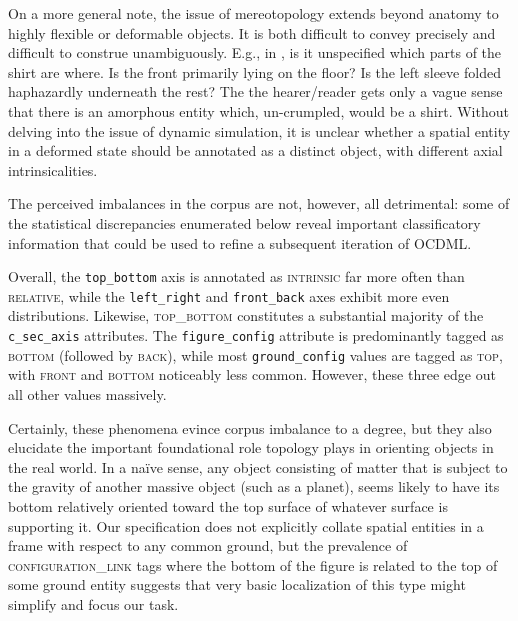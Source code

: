 \documentclass[11pt]{article}
\begin{document}
On a more general note, the issue of mereotopology extends beyond anatomy to highly flexible or deformable objects. It is both difficult to convey precisely and difficult to construe unambiguously. E.g., in , is it unspecified which parts of the shirt are where. Is the front primarily lying on the floor? Is the left sleeve folded haphazardly underneath the rest? The the hearer/reader gets only a vague sense that there is an amorphous entity which, un-crumpled, would be a shirt. Without delving into the issue of dynamic simulation, it is unclear whether a spatial entity in a deformed state should be annotated as a distinct object, with different axial intrinsicalities.

\label{ex:shirt-crumpled}

The perceived imbalances in the corpus are not, however, all detrimental: some of the statistical discrepancies enumerated below reveal important classificatory information that could be used to refine a subsequent iteration of OCDML.

Overall, the \texttt{top\_bottom} axis is annotated as \textsc{intrinsic} far more often than \textsc{relative}, while the \texttt{left\_right} and \texttt{front\_back} axes exhibit more even distributions. Likewise, \textsc{top\_bottom} constitutes a substantial majority of the \texttt{c\_sec\_axis} attributes. The \texttt{figure\_config} attribute is predominantly tagged as \textsc{bottom} (followed by \textsc{back}), while most \texttt{ground\_config} values are tagged as \textsc{top}, with \textsc{front} and \textsc{bottom} noticeably less common. However, these three edge out all other values massively.

Certainly, these phenomena evince corpus imbalance to a degree, but they also elucidate the important foundational role topology plays in orienting objects in the real world. In a naïve sense, any object consisting of matter that is subject to the gravity of another massive object (such as a planet), seems likely to have its bottom relatively oriented toward the top surface of whatever surface is supporting it. Our specification does not explicitly collate spatial entities in a frame with respect to any common ground, but the prevalence of \textsc{configuration\_link} tags where the bottom of the figure is related to the top of some ground entity suggests that very basic localization of this type might simplify and focus our task.
\end{document}
